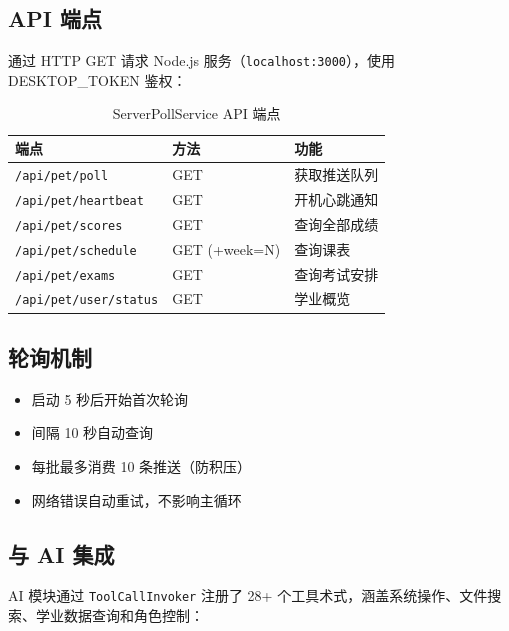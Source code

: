 \documentclass[12pt,a4paper]{ctexart}
\begin{document}
\subsection{API 端点}

通过 HTTP GET 请求 Node.js 服务（\texttt{localhost:3000}），使用 DESKTOP\_TOKEN 鉴权：

\begin{table}[H]
\centering
\caption{ServerPollService API 端点}
\label{tab:poll-api}
\begin{tabular}{lll}
\toprule
\textbf{端点} & \textbf{方法} & \textbf{功能} \\
\midrule
\texttt{/api/pet/poll} & GET & 获取推送队列 \\
\texttt{/api/pet/heartbeat} & GET & 开机心跳通知 \\
\texttt{/api/pet/scores} & GET & 查询全部成绩 \\
\texttt{/api/pet/schedule} & GET (+week=N) & 查询课表 \\
\texttt{/api/pet/exams} & GET & 查询考试安排 \\
\texttt{/api/pet/user/status} & GET & 学业概览 \\
\bottomrule
\end{tabular}
\end{table}

\subsection{轮询机制}

\begin{itemize}
    \item 启动 5 秒后开始首次轮询
    \item 间隔 10 秒自动查询
    \item 每批最多消费 10 条推送（防积压）
    \item 网络错误自动重试，不影响主循环
\end{itemize}

\subsection{与 AI 集成}

AI 模块通过 \texttt{ToolCallInvoker} 注册了 28+ 个工具术式，涵盖系统操作、文件搜索、学业数据查询和角色控制：
\end{document}
